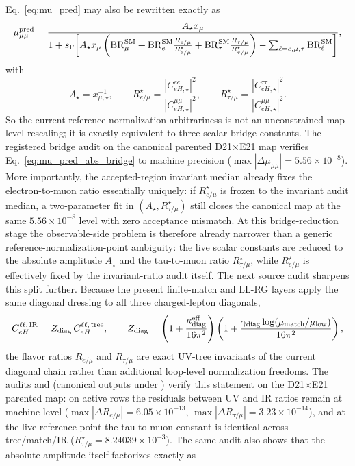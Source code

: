 \documentclass[aps,prd,onecolumn,notitlepage,nofootinbib,superscriptaddress,11pt,floatfix]{revtex4-2}
\begin{document}
Eq.~\eqref{eq:mu_pred} may also be rewritten exactly as
\begin{equation}
\mu_{\mu\mu}^{\rm pred}
=
\frac{A_\star x_\mu}
{1+s_\Gamma\!\left[
A_\star x_\mu
\left(
\mathrm{BR}_\mu^{\rm SM}
+\mathrm{BR}_e^{\rm SM}\frac{R_{e/\mu}}{R_{e/\mu}^\star}
+\mathrm{BR}_\tau^{\rm SM}\frac{R_{\tau/\mu}}{R_{\tau/\mu}^\star}
\right)
-\sum_{\ell=e,\mu,\tau}\mathrm{BR}_\ell^{\rm SM}
\right]},
\label{eq:mu_pred_abs_bridge}
\end{equation}
with
\[
A_\star=x_{\mu,\star}^{-1},\qquad
R_{e/\mu}^\star=\frac{|C_{eH,\star}^{ee}|^2}{|C_{eH,\star}^{\mu\mu}|^2},\qquad
R_{\tau/\mu}^\star=\frac{|C_{eH,\star}^{\tau\tau}|^2}{|C_{eH,\star}^{\mu\mu}|^2}.
\]
So the current reference-normalization arbitrariness is not an unconstrained map-level rescaling; it is exactly equivalent to three scalar bridge constants. The registered bridge audit on the canonical parented D21$\times$E21 map verifies Eq.~\eqref{eq:mu_pred_abs_bridge} to machine precision ($\max|\Delta\mu_{\mu\mu}|=5.56\times10^{-8}$). More importantly, the accepted-region invariant median already fixes the electron-to-muon ratio essentially uniquely: if $R_{e/\mu}^\star$ is frozen to the invariant audit median, a two-parameter fit in $(A_\star,R_{\tau/\mu}^\star)$ still closes the canonical map at the same $5.56\times10^{-8}$ level with zero acceptance mismatch. At this bridge-reduction stage the observable-side problem is therefore already narrower than a generic reference-normalization-point ambiguity: the live scalar constants are reduced to the absolute amplitude $A_\star$ and the tau-to-muon ratio $R_{\tau/\mu}^\star$, while $R_{e/\mu}^\star$ is effectively fixed by the invariant-ratio audit itself.
The next source audit sharpens this split further. Because the present finite-match and LL-RG layers apply the same diagonal dressing to all three charged-lepton diagonals,
\[
C_{eH}^{\ell\ell,\,\rm IR}=Z_{\rm diag}\,C_{eH}^{\ell\ell,\,\rm tree},
\qquad
Z_{\rm diag}=
\left(1+\frac{\kappa_{\rm diag}^{\rm eff}}{16\pi^2}\right)
\left(1+\frac{\gamma_{\rm diag}\log(\mu_{\rm match}/\mu_{\rm low})}{16\pi^2}\right),
\]
the flavor ratios $R_{e/\mu}$ and $R_{\tau/\mu}$ are exact UV-tree invariants of the current diagonal chain rather than additional loop-level normalization freedoms. The audits  and  (canonical outputs under ) verify this statement on the D21$\times$E21 parented map: on active rows the residuals between UV and IR ratios remain at machine level ($\max|\Delta R_{e/\mu}|=6.05\times10^{-13}$, $\max|\Delta R_{\tau/\mu}|=3.23\times10^{-14}$), and at the live reference point the tau-to-muon constant is identical across tree/match/IR ($R_{\tau/\mu}^\star=8.24039\times10^{-3}$). The same audit also shows that the absolute amplitude itself factorizes exactly as
\end{document}
